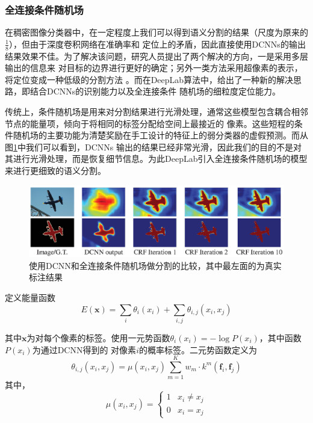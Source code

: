 \documentclass[10pt, a4paper]{article}
\begin{document}
\subsubsection{全连接条件随机场}
在稠密图像分类器中，在一定程度上我们可以得到语义分割的结果（尺度为原来的$\frac{1}{8}$），但由于深度卷积网络在准确率和
定位上的矛盾，因此直接使用DCNNs的输出结果效果不佳。为了解决该问题，研究人员提出了两个解决的方向，一是采用多层输出的信息来
对目标的边界进行更好的确定\cite{FCN,eigen2015predicting}；另外一类方法采用超像素的表示，将定位变成一种低级的分割方法
\cite{mostajabi2015feedforward}。而在DeepLab算法中，给出了一种新的解决思路，即结合DCNNs的识别能力以及全连接条件
随机场的细粒度定位能力。

传统上，条件随机场是用来对分割结果进行光滑处理，通常这些模型包含耦合相邻节点的能量项，倾向于将相同的标签分配给空间上最接近的
像素。这些短程的条件随机场的主要功能为清楚奖励在手工设计的特征上的弱分类器的虚假预测。而从图\ref{p3}中我们可以看到，DCNNs
输出的结果已经非常光滑，因此我们的目的不是对其进行光滑处理，而是恢复细节信息。为此DeepLab引入全连接条件随机场的模型\cite{FC-CRF}
来进行更细致的语义分割。

\begin{figure}[htbp]
    \centering
    \includegraphics[width=\textwidth]{p3.eps}
    \caption{使用DCNN和全连接条件随机场做分割的比较，其中最左面的为真实标注结果}
    \label{p3}
\end{figure}

定义能量函数
\begin{equation}
    E(\bm{x}) = \sum_i \theta_i(x_i) + \sum_{i,j}\theta_{i, j}(x_i, x_j)
\end{equation}

其中$\bm{x}$为对每个像素的标签。使用一元势函数$\theta_i(x_i) = -\log P(x_i)$，其中函数$P(x_i)$为通过DCNN得到的
对像素$i$的概率标签。二元势函数定义为
\[
    \theta_{i, j}(x_i, x_j) = \mu(x_i, x_j)\sum_{m=1}^K w_m\cdot k^m(\bm{f}_i, \bm{f}_j)
\]
其中，
\[
    \mu(x_i, x_j) = 
    \begin{cases}
        1 & x_i \neq x_j \\
         0 & x_i = x_j
    \end{cases} 
\]
\end{document}
